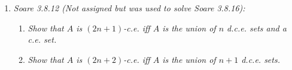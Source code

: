\documentclass{article}
\begin{document}
\begin{enumerate}[label={\bf Q\arabic*:}]
\begin{enumerate}[label={(\roman*)}]
      \item Show that there is an ordinal $\beta$ such that
        $D^\beta(T)=D^\alpha(T)$ for all $\alpha>\beta$. Define
        $D^\infty(T)=D^\beta(T)$. Prove that there is an $\alpha<\omega_1$
        such that $D^\alpha=D^\infty(T)$. We call $D^\infty(T)$ and
        $[D^\infty(T)]$ the perfect kernel.

        \begin{proof}
        \end{proof}

      \item Prove that either $D^\infty(T)=\emptyset$ or else $D^\infty(T)$
        is a perfect tree, namely every $\sigma\in D^\infty(T)$ splits as
        defined above. In this case $D^\infty(T)$ has $2^{\aleph_0}$ many
        infinite paths.

        \begin{proof}
        \end{proof}

      \item Let $\beta$ be as in (ii). Prove that
        $[D^\alpha(T)]-[D^{\alpha+1}(T)]$ is countable for every
        $\alpha<\beta$. Therefore, $\cup_{\alpha<\beta}[D^\alpha(T)]$ is
        countable, namely $[T]-[D^\infty(T)]$ is countable.

        \begin{proof}
        \end{proof}
    \end{enumerate}

  \item \label{q:ce} \it Soare 3.8.12 (Not assigned but was used to solve
    Soare 3.8.16):
    \begin{enumerate}[label={(\roman*)}]
      \item \it Show that $A$ is $(2n+1)$-c.e. iff $A$ is the union of $n$
        d.c.e. sets and a c.e. set.
      \item \it Show that $A$ is $(2n+2)$-c.e. iff $A$ is the union of $n+1$
        d.c.e. sets.
    \end{enumerate}


\end{enumerate}
\end{document}
